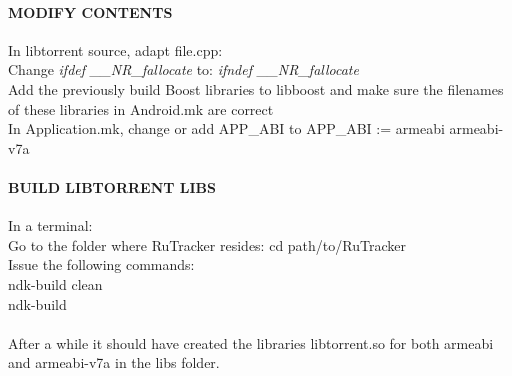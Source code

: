 \paragraph{MODIFY CONTENTS}
In libtorrent source, adapt file.cpp: \\
Change \emph{ifdef \_\_NR\_fallocate} to: \emph{ifndef \_\_NR\_fallocate}\\

Add the previously build Boost libraries to libboost and make sure the filenames of these libraries in Android.mk are correct\\
In Application.mk, change or add APP\_ABI to APP\_ABI := armeabi armeabi-v7a\\

\paragraph{BUILD LIBTORRENT LIBS}
In a terminal:\\
Go to the folder where RuTracker resides: cd path/to/RuTracker\\
Issue the following commands:\\
ndk-build clean\\
ndk-build\\
\\
After a while it should have created the libraries libtorrent.so for both armeabi and armeabi-v7a in the libs folder.\\